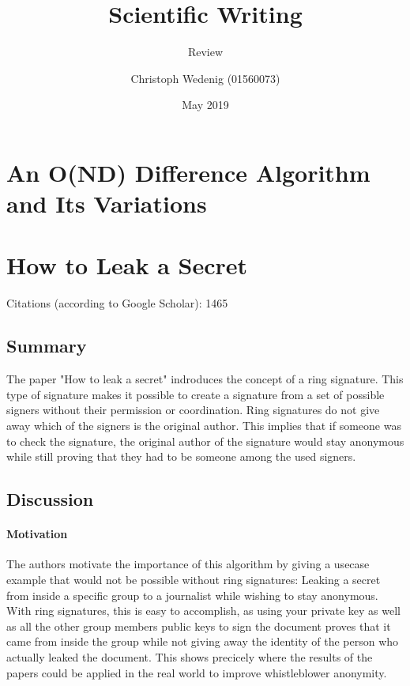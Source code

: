 \documentclass{scrartcl}
\title{Scientific Writing}
\subtitle{Review}
\author{Christoph Wedenig (01560073)}
\date{May 2019}
\begin{document}
\maketitle

\section{An O(ND) Difference Algorithm and Its Variations}


\section{How to Leak a Secret}
Citations (according to Google Scholar): 1465
\subsection{Summary}
The paper "How to leak a secret" \cite{rivest2001leak} indroduces the concept of a ring signature. This type of signature makes it possible to create a signature from a set of possible signers without their permission or coordination. Ring signatures do not give away which of the signers is the original author.  This implies that if someone was to check the signature, the original author of the signature would stay anonymous while still proving that they had to be someone among the used signers. %

\subsection{Discussion}
\paragraph{Motivation}{
The authors motivate the importance of this algorithm by giving a usecase example that would not be possible without ring signatures: Leaking a secret from inside a specific group to a journalist while wishing to stay anonymous. With ring signatures, this is easy to accomplish, as using your private key as well as all the other group members public keys to sign the document proves that it came from inside the group while not giving away the identity of the person who actually leaked the document. This shows precicely where the results of the papers could be applied in the real world to improve whistleblower anonymity.
}




\end{document}
